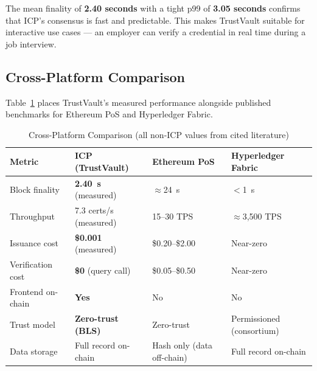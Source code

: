 \documentclass[journal]{IEEEtran}
\begin{document}
The mean finality of \textbf{2.40 seconds} with a tight p99 of \textbf{3.05 seconds} confirms that ICP's consensus is fast and predictable. This makes TrustVault suitable for interactive use cases — an employer can verify a credential in real time during a job interview.

\subsection{Cross-Platform Comparison}

Table~\ref{tab:comparison} places TrustVault's measured performance alongside published benchmarks for Ethereum PoS and Hyperledger Fabric.

\begin{table}[t]
\caption{Cross-Platform Comparison (all non-ICP values from cited literature)}
\label{tab:comparison}
\centering\small\renewcommand{\arraystretch}{1.2}
\begin{tabular}{@{}llll@{}}
\toprule
\textbf{Metric} & \textbf{ICP (TrustVault)} & \textbf{Ethereum PoS} & \textbf{Hyperledger Fabric} \\
\midrule
Block finality        & \textbf{2.40~s} (measured)    & $\approx$24~s~\cite{buterin2020eth2}  & $<$1~s~\cite{androulaki2018fabric} \\
Throughput            & 7.3 certs/s (measured)        & 15--30 TPS~\cite{dinh2017blockbench}  & $\approx$3{,}500 TPS~\cite{androulaki2018fabric} \\
Issuance cost         & \textbf{\$0.001} (measured)   & \$0.20--\$2.00~\cite{wood2014ethereum} & Near-zero \\
Verification cost     & \textbf{\$0} (query call)     & \$0.05--\$0.50~\cite{wood2014ethereum} & Near-zero \\
Frontend on-chain     & \textbf{Yes}                  & No                                     & No \\
Trust model           & \textbf{Zero-trust (BLS)}     & Zero-trust                             & Permissioned (consortium) \\
Data storage          & Full record on-chain          & Hash only (data off-chain)             & Full record on-chain \\
\bottomrule
\end{tabular}
\end{table}
\end{document}
